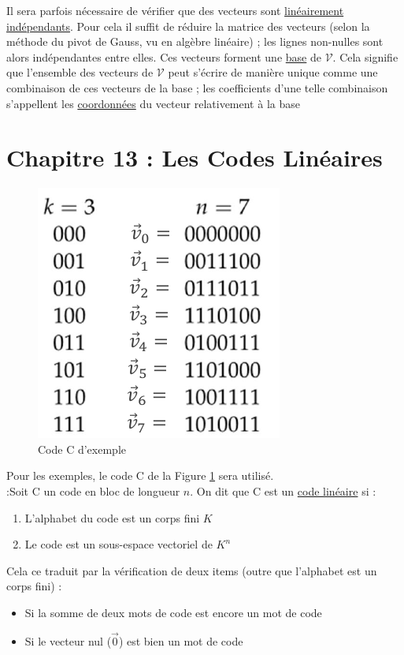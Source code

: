 \documentclass[11pt,a4paper]{article}
\newcommand{\m}[1]{\ensuremath{\mathcal{#1}}}
\begin{document}
Il sera parfois nécessaire de vérifier que des vecteurs sont \uline{linéairement indépendants}. Pour cela il suffit de réduire la matrice des vecteurs (selon la méthode du pivot de Gauss, vu en algèbre linéaire) ; les lignes non-nulles sont alors indépendantes entre elles. Ces vecteurs forment une \uline{base} de \m{V}. Cela signifie que l'ensemble des vecteurs de \m{V} peut s'écrire de manière unique comme une combinaison de ces vecteurs de la base ; les coefficients d'une telle combinaison s'appellent les \uline{coordonnées} du vecteur relativement à la base

\section[Codes linéaires]{Chapitre 13 : Les Codes Linéaires}
\begin{figure}	
	\includegraphics[scale=0.5]{images/code_C}
	\captionsetup{justification=centering}	
	\caption{Code C d'exemple}
	\label{code d'exemple}
\end{figure}
Pour les exemples, le code C de la Figure \ref{code d'exemple} sera utilisé.\\
 :Soit C un code en bloc de longueur $n$. On dit que C est un \uline{code linéaire} si :
\begin{enumerate}
	\item 	L'alphabet du code est un corps fini $K$
	\item 	Le code est un sous-espace vectoriel de $K^n$
\end{enumerate}
Cela ce traduit par la vérification de deux items (outre que l'alphabet est un corps fini) :
\begin{itemize}
	\item 	Si la somme de deux mots de code est encore un mot de code
	\item 	Si le vecteur nul ($\vec{0}$) est bien un mot de code
\end{itemize}
\end{document}
